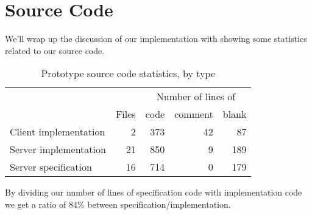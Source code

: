 \section{Source Code}
\label{section:implementation.source.code}

We'll wrap up the discussion of our implementation with showing some
statistics related to our source code.

\begin{table}
  \begin{tabular}{lrrrr}

    &
    &
    \multicolumn{3}{c}{Number of lines of} \\

    &
    \multicolumn{1}{c}{Files} &
    \multicolumn{1}{c}{code} &
    \multicolumn{1}{c}{comment} &
    \multicolumn{1}{c}{blank} \\

    \cmidrule(lr){2-2}
    \cmidrule(lr){3-5}

    Client implementation &
    2 &
    373 &
    42 &
    87 \\

    Server implementation &
    21 &
    850 &
    9 &
    189 \\

    Server specification &
    16 &
    714 &
    0 &
    179 \\

  \end{tabular}
  \caption[Prototype Source Code Statistics]{%
    Prototype source code statistics, by type}
  \label{table:prototype.source.code.stats}
\end{table}

By dividing our number of lines of specification code with implementation code
we get a ratio of 84\% between specification/implementation.
